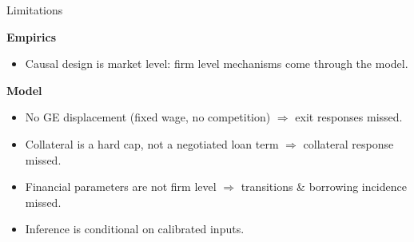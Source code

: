 \documentclass[aspectratio=169]{beamer}
\begin{document}

\begin{frame}{Limitations}

\textbf{Empirics}
\begin{itemize}
    \item Causal design is market level: firm level mechanisms come through the model.
\end{itemize}

\vspace{2mm}
\textbf{Model}
\begin{itemize}
    \item No GE displacement (fixed wage, no competition) $\Rightarrow$ exit responses missed.
    \item Collateral is a hard cap, not a negotiated loan term $\Rightarrow$ collateral response missed.
    \item Financial parameters are not firm level
    $\Rightarrow$ transitions \& borrowing incidence missed.
    \item Inference is conditional on calibrated inputs.
\end{itemize}
\end{frame}

\end{document}
